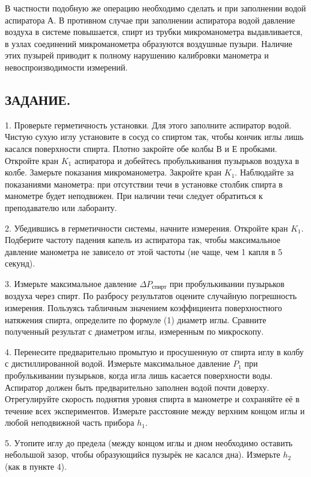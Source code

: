 \documentclass[a4paper,12pt]{article} %
\theoremstyle{plain} %
\theoremstyle{definition} %
\theoremstyle{remark} %
\begin{document}
В частности подобную же операцию необходимо сделать и при заполнении водой аспиратора А. В противном случае при заполнении аспиратора водой давление воздуха в системе повышается, спирт из трубки микроманометра выдавливается, в узлах соединений микроманометра образуются воздушные пузыри. Наличие этих пузырей приводит к полному нарушению калибровки манометра и невоспроизводимости измерений.

\newpage

\begin{center}
\section*{ЗАДАНИЕ.}
\end{center}

1. Проверьте герметичность установки. Для этого заполните аспиратор водой. Чистую сухую иглу установите в сосуд со спиртом так, чтобы кончик иглы лишь касался поверхности спирта. Плотно закройте обе колбы В и Е пробками. Откройте кран $K_1$ аспиратора и добейтесь пробулькивания пузырьков воздуха в колбе. Замерьте показания микроманометра. Закройте кран $K_1$. Наблюдайте за показаниями манометра: при отсутствии течи в установке столбик спирта в манометре будет неподвижен. При наличии течи следует обратиться к преподавателю или лаборанту.

2. Убедившись в герметичности системы, начните измерения. Откройте кран $K_1$. Подберите частоту падения капель из аспиратора так, чтобы максимальное давление манометра не зависело от этой частоты (не чаще, чем 1 капля в 5 секунд).

3. Измерьте максимальное давление $\Delta P_{\text{спирт}}$  при  пробулькивании пузырьков воздуха через спирт. По разбросу результатов оцените случайную погрешность измерения. Пользуясь табличным значением коэффициента поверхностного натяжения спирта, определите по формуле (1) диаметр иглы. Сравните полученный результат с диаметром иглы, измеренным по микроскопу.

4. Перенесите предварительно промытую и просушенную от спирта иглу в колбу с дистиллированной водой. Измерьте максимальное давление $P_1$ при пробулькивании пузырьков, когда игла лишь касается поверхности воды. Аспиратор должен быть предварительно  заполнен водой почти доверху. Отрегулируйте скорость поднятия уровня спирта в манометре и сохраняйте её в течение всех экспериментов. Измерьте расстояние между верхним концом иглы и любой неподвижной часть прибора $h_1$.

5. Утопите иглу до предела (между концом иглы и дном необходимо оставить небольшой зазор, чтобы образующийся пузырёк не касался дна). Измерьте $h_2$ (как в пункте 4).
\end{document}
